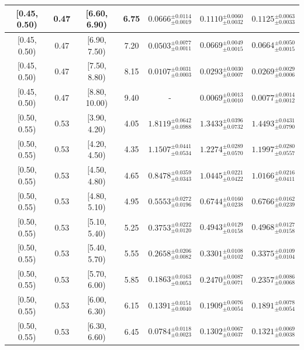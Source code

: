 \begin{longtable}{|c|c|c|c|c|c|c|}
\hline
[0.45, 0.50) & 0.47 & [6.60, 6.90) & 6.75 & $0.0666^{ \pm 0.0114 }_{ \pm 0.0019 }$ & $0.1110^{ \pm 0.0060 }_{ \pm 0.0032 }$ & $0.1125^{ \pm 0.0063 }_{ \pm 0.0033 }$ \\ 
\hline
[0.45, 0.50) & 0.47 & [6.90, 7.50) & 7.20 & $0.0503^{ \pm 0.0077 }_{ \pm 0.0011 }$ & $0.0669^{ \pm 0.0049 }_{ \pm 0.0015 }$ & $0.0664^{ \pm 0.0050 }_{ \pm 0.0015 }$ \\ 
\hline
[0.45, 0.50) & 0.47 & [7.50, 8.80) & 8.15 & $0.0107^{ \pm 0.0031 }_{ \pm 0.0003 }$ & $0.0293^{ \pm 0.0030 }_{ \pm 0.0007 }$ & $0.0269^{ \pm 0.0029 }_{ \pm 0.0006 }$ \\ 
\hline
[0.45, 0.50) & 0.47 & [8.80, 10.00) & 9.40 & - & $0.0069^{ \pm 0.0013 }_{ \pm 0.0010 }$ & $0.0077^{ \pm 0.0014 }_{ \pm 0.0012 }$ \\ 
\hline
[0.50, 0.55) & 0.53 & [3.90, 4.20) & 4.05 & $1.8119^{ \pm 0.0642 }_{ \pm 0.0988 }$ & $1.3433^{ \pm 0.0396 }_{ \pm 0.0732 }$ & $1.4493^{ \pm 0.0431 }_{ \pm 0.0790 }$ \\ 
\hline
[0.50, 0.55) & 0.53 & [4.20, 4.50) & 4.35 & $1.1507^{ \pm 0.0441 }_{ \pm 0.0534 }$ & $1.2274^{ \pm 0.0289 }_{ \pm 0.0570 }$ & $1.1997^{ \pm 0.0280 }_{ \pm 0.0557 }$ \\ 
\hline
[0.50, 0.55) & 0.53 & [4.50, 4.80) & 4.65 & $0.8478^{ \pm 0.0359 }_{ \pm 0.0343 }$ & $1.0445^{ \pm 0.0221 }_{ \pm 0.0422 }$ & $1.0166^{ \pm 0.0216 }_{ \pm 0.0411 }$ \\ 
\hline
[0.50, 0.55) & 0.53 & [4.80, 5.10) & 4.95 & $0.5553^{ \pm 0.0272 }_{ \pm 0.0196 }$ & $0.6744^{ \pm 0.0160 }_{ \pm 0.0238 }$ & $0.6766^{ \pm 0.0162 }_{ \pm 0.0239 }$ \\ 
\hline
[0.50, 0.55) & 0.53 & [5.10, 5.40) & 5.25 & $0.3753^{ \pm 0.0222 }_{ \pm 0.0120 }$ & $0.4943^{ \pm 0.0129 }_{ \pm 0.0158 }$ & $0.4968^{ \pm 0.0127 }_{ \pm 0.0158 }$ \\ 
\hline
[0.50, 0.55) & 0.53 & [5.40, 5.70) & 5.55 & $0.2658^{ \pm 0.0206 }_{ \pm 0.0082 }$ & $0.3301^{ \pm 0.0108 }_{ \pm 0.0102 }$ & $0.3375^{ \pm 0.0109 }_{ \pm 0.0104 }$ \\ 
\hline
[0.50, 0.55) & 0.53 & [5.70, 6.00) & 5.85 & $0.1863^{ \pm 0.0163 }_{ \pm 0.0053 }$ & $0.2470^{ \pm 0.0087 }_{ \pm 0.0071 }$ & $0.2357^{ \pm 0.0086 }_{ \pm 0.0068 }$ \\ 
\hline
[0.50, 0.55) & 0.53 & [6.00, 6.30) & 6.15 & $0.1391^{ \pm 0.0151 }_{ \pm 0.0040 }$ & $0.1909^{ \pm 0.0076 }_{ \pm 0.0054 }$ & $0.1891^{ \pm 0.0078 }_{ \pm 0.0054 }$ \\ 
\hline
[0.50, 0.55) & 0.53 & [6.30, 6.60) & 6.45 & $0.0784^{ \pm 0.0118 }_{ \pm 0.0023 }$ & $0.1302^{ \pm 0.0067 }_{ \pm 0.0037 }$ & $0.1321^{ \pm 0.0069 }_{ \pm 0.0038 }$ \\ 

\end{longtable}
